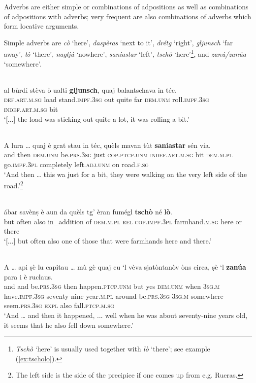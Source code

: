 Adverbs are either simple or combinations of adpositions as well as combinations of adpositions with adverbs; very frequent are also combinations of adverbs which form locative arguments.

Simple adverbs are \textit{cò} `here', \textit{daspèras} `next to it', \textit{drétg} `right', \textit{gljunsch} `far away', \textit{lò} `there', \textit{nagljú} `nowhere',  \textit{saniastar} `left', \textit{tschò} `here'\footnote{\textit{Tschò} `here' is usually used together with \textit{lò} `there'; see example (\ref{ex:tscholo}).}, and \textit{zanú/zanúa} `somewhere'.

\ea
\label{}
\\
\gll  [...] al bùrdi stèva ò ualti \textbf{gljunsch}, quaj balantschava in téc.\\
{} \textsc{def.art.m.sg} load  stand.\textsc{impf.3sg} out quite far \textsc{dem.unm} roll.\textsc{impf.3sg}  \textsc{indef.art.m.sg} bit\\
\glt `[...] the load was sticking out quite a lot, it was rolling a bit.'
\z

\ea
\label{}
\\
\gll A lura … quaj è grat stau in téc, quèls mavan tùt \textbf{saniastar} sén via.   \\
and then {} \textsc{dem.unm} be.\textsc{prs.3sg} just \textsc{cop.ptcp.unm} \textsc{indef.art.m.sg} bit \textsc{dem.m.pl} go.\textsc{impf.3pl} completely left.\textsc{adj.unm} on road.\textsc{f.sg}  \\
\glt `And then … this wa just for a bit, they were walking on the very left side of the road.'\footnote{The left side is the side of the precipice if one comes up from e.g. Rueras.}
\z

\ea
\label{ex:tscholo}
\\
\gll [...] ábar savènṣ è aun da quèls tg’ èran fumégl \textbf{tschò} né \textbf{lò}.\\
{} but often also in\_addition of \textsc{dem.m.pl} \textsc{rel} \textsc{cop.impf.3pl} farmhand.\textsc{m.sg} here or there\\
\glt `[...] but often also one of those that were farmhands here and there.'
\z

\ea
\label{}
\\
\gll  A … api ṣè lu capitau … mù gè quaj cu `l vèva sjatòntanòv òns circa, ṣè `l \textbf{zanúa} para i è ruclaus.  \\
and {} and be.\textsc{prs.3sg} then happen.\textsc{ptcp.unm} {} but yes \textsc{dem.unm} when \textsc{3sg.m} have.\textsc{impf.3sg} seventy-nine year.\textsc{m.pl} around be.\textsc{prs.3sg} \textsc{3sg.m} somewhere  seem.\textsc{prs.3sg} \textsc{expl} also fall.\textsc{ptcp.m.sg}\\
\glt `And … and then it happened, ... well when he was about seventy-nine years old, it seems that he also fell down somewhere.'
\z

